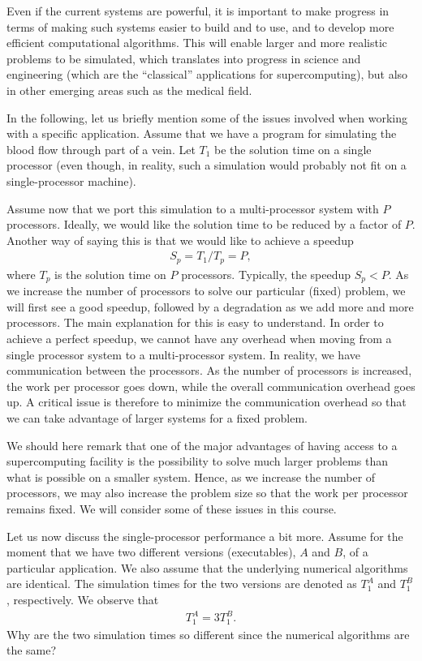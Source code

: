 Even if the current systems are powerful, it is important to make progress in
terms of making such systems easier to build and to use, and to develop more
efficient computational algorithms. This will enable larger and more realistic
problems to be simulated, which translates into progress in science and
engineering (which are the ``classical'' applications for supercomputing), but
also in other emerging areas such as the medical field.

In the following, let us briefly mention some of the issues involved when
working with a specific application. Assume that we have a program for
simulating the blood flow through part of a vein. Let $T_1$ be the solution time
on a single processor (even though, in reality, such a simulation would probably
not fit on a single-processor machine).

Assume now that we port this simulation to a multi-processor system with $P$
processors. Ideally, we would like the solution time to be reduced by a factor
of $P$. Another way of saying this is that we would like to achieve a speedup
\begin{align}
  S_p=T_1/T_p = P,
\end{align}
where $T_p$ is the solution time on $P$ processors. Typically, the speedup $S_p
< P$. As we increase the number of processors to solve our particular (fixed)
problem, we will first see a good speedup, followed by a degradation as we add
more and more processors. The main explanation for this is easy to understand.
In order to achieve a perfect speedup, we cannot have any overhead when moving
from a single processor system to a multi-processor system. In reality, we have
communication between the processors. As the number of processors is increased,
the work per processor goes down, while the overall communication overhead goes
up. A critical issue is therefore to minimize the communication overhead so that
we can take advantage of larger systems for a fixed problem.

We should here remark that one of the major advantages of having access to a
supercomputing facility is the possibility to solve much larger problems than
what is possible on a smaller system. Hence, as we increase the number of
processors, we may also increase the problem size so that the work per processor
remains fixed. We will consider some of these issues in this course.

Let us now discuss the single-processor performance a bit more. Assume for the
moment that we have two different versions (executables), $A$ and $B$, of a
particular application. We also assume that the underlying numerical algorithms
are identical. The simulation times for the two versions are denoted as $T_1^A$
and $T_1^B$, respectively. We observe that
\begin{align}
  T_1^A = 3 T_1^B.
\end{align}
Why are the two simulation times so different since the numerical algorithms are
the same?

